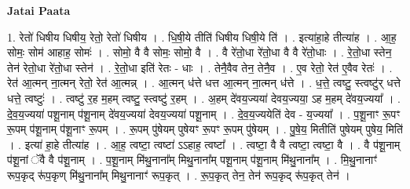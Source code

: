 \documentclass[17pt]{extarticle}
\begin{document}
\textbf{Jatai Paata} \newline

1. रेतो॑ धिषीय धिषीय॒ रेतो॒ रेतो॑ धिषीय । . धि॒षी॒ये तीति॑ धिषीय धिषी॒ये ति॑ । . इत्या॑हा॒हे तीत्या॑ह । . आ॒ह॒ सोमः॒ सोम॑ आहाह॒ सोमः॑ । . सोमो॒ वै वै सोमः॒ सोमो॒ वै । . वै रे॑तो॒धा रे॑तो॒धा वै वै रे॑तो॒धाः । . रे॒तो॒धा स्तेन॒ तेन॑ रेतो॒धा रे॑तो॒धा स्तेन॑ । . रे॒तो॒धा इति॑ रेतः - धाः । . तेनै॒वैव तेन॒ तेनै॒व । . ए॒व रेतो॒ रेत॑ ए॒वैव रेतः॑ । . रेत॑ आ॒त्मन् ना॒त्मन् रेतो॒ रेत॑ आ॒त्मन्न् । . आ॒त्मन् ध॑त्ते धत्त आ॒त्मन् ना॒त्मन् ध॑त्ते । . ध॒त्ते॒ त्वष्टु॒ स्त्वष्टु॑र् धत्ते धत्ते॒ त्वष्टुः॑ । . त्वष्टु॑ र॒ह म॒हम् त्वष्टु॒ स्त्वष्टु॑ र॒हम् । . अ॒हम् दे॑वय॒ज्यया॑ देवय॒ज्यया॒ ऽह म॒हम् दे॑वय॒ज्यया᳚ । . दे॒व॒य॒ज्यया॑ पशू॒नाम् प॑शू॒नाम् दे॑वय॒ज्यया॑ देवय॒ज्यया॑ पशू॒नाम् । . दे॒व॒य॒ज्ययेति॑ देव - य॒ज्यया᳚ । . प॒शू॒नाꣳ रू॒पꣳ रू॒पम् प॑शू॒नाम् प॑शू॒नाꣳ रू॒पम् । . रू॒पम् पु॑षेयम् पुषेयꣳ रू॒पꣳ रू॒पम् पु॑षेयम् । . पु॒षे॒य॒ मितीति॑ पुषेयम् पुषेय॒ मिति॑ । . इत्या॑ हा॒हे तीत्या॑ह । . आ॒ह॒ त्वष्टा॒ त्वष्टा॑ ऽऽहाह॒ त्वष्टा᳚ । . त्वष्टा॒ वै वै त्वष्टा॒ त्वष्टा॒ वै । . वै प॑शू॒नाम् प॑शू॒नां ॅवै वै प॑शू॒नाम् । . प॒शू॒नाम् मि॑थु॒नाना᳚म् मिथु॒नाना᳚म् पशू॒नाम् प॑शू॒नाम् मि॑थु॒नाना᳚म् । . मि॒थु॒नानाꣳ॑ रूप॒कृद् रू॑प॒कृण् मि॑थु॒नाना᳚म् मिथु॒नानाꣳ॑ रूप॒कृत् । . रू॒प॒कृत् तेन॒ तेन॑ रूप॒कृद् रू॑प॒कृत् तेन॑ । \newline
\end{document}

